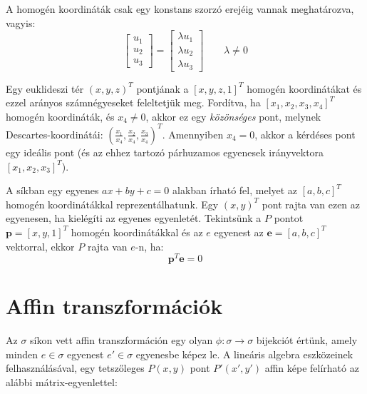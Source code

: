 A homogén koordináták csak egy konstans szorzó erejéig vannak meghatározva, vagyis:
\[\left[\begin{array}{c} u_1\\ u_2\\ u_3 \end{array}\right] = \left[\begin{array}{c} \lambda u_1\\ \lambda u_2\\ \lambda u_3 \end{array}\right] \qquad \lambda \neq 0\]

Egy euklideszi tér $(x, y, z)^T$ pontjának a $[x, y, z, 1]^T$ homogén koordinátákat és ezzel arányos számnégyeseket feleltetjük meg. Fordítva, ha $[x_1, x_2, x_3, x_4]^T$ homogén koordináták, és $x_4 \neq 0$, akkor ez egy \textit{közönséges} pont, melynek Descartes-koordinátái: $\left(\frac{x_1}{x_4}, \frac{x_2}{x_4}, \frac{x_3}{x_4}\right)^T$. Amennyiben $x_4 = 0$, akkor a kérdéses pont egy ideális pont (és az ehhez tartozó párhuzamos egyenesek irányvektora $[x_1, x_2, x_3]^T$).

A síkban egy egyenes $ax + by + c = 0$ alakban írható fel, melyet az $[a, b, c]^T$ homogén koordinátákkal reprezentálhatunk. Egy $(x, y)^T$ pont rajta van ezen az egyenesen, ha kielégíti az egyenes egyenletét. Tekintsünk a $P$ pontot $\mathbf{p} = [x, y, 1]^T$ homogén koordinátákkal és az $e$ egyenest az $\mathbf{e} = [a, b, c]^T$ vektorral, ekkor $P$ rajta van $e$-n, ha: 
\[\mathbf{p}^T \mathbf{e} = 0\]

\section{Affin transzformációk}

Az $\sigma$ síkon vett affin transzformáción egy olyan $\phi : \sigma \rightarrow \sigma$ bijekciót értünk, amely minden $e\in\sigma$ egyenest $e'\in\sigma$ egyenesbe képez le. A lineáris algebra eszközeinek felhasználásával, egy tetszőleges $P(x, y)$ pont $P'(x', y')$ affin képe felírható az alábbi mátrix-egyenlettel:

